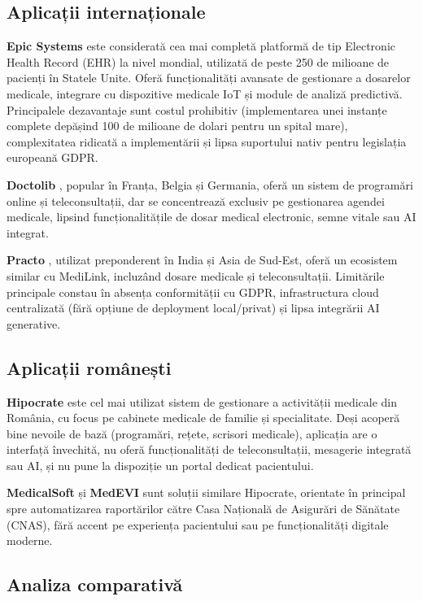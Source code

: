 \subsection{Aplicații internaționale}

\textbf{Epic Systems} \cite{epic2024} este considerată cea mai completă platformă de tip Electronic Health Record (EHR) la nivel mondial, utilizată de peste 250 de milioane de pacienți în Statele Unite. Oferă funcționalități avansate de gestionare a dosarelor medicale, integrare cu dispozitive medicale IoT și module de analiză predictivă. Principalele dezavantaje sunt costul prohibitiv (implementarea unei instanțe complete depășind 100 de milioane de dolari pentru un spital mare), complexitatea ridicată a implementării și lipsa suportului nativ pentru legislația europeană GDPR.

\textbf{Doctolib} \cite{doctolib2024}, popular în Franța, Belgia și Germania, oferă un sistem de programări online și teleconsultații, dar se concentrează exclusiv pe gestionarea agendei medicale, lipsind funcționalitățile de dosar medical electronic, semne vitale sau AI integrat.

\textbf{Practo} \cite{practo2024}, utilizat preponderent în India și Asia de Sud-Est, oferă un ecosistem similar cu MediLink, incluzând dosare medicale și teleconsultații. Limitările principale constau în absența conformității cu GDPR, infrastructura cloud centralizată (fără opțiune de deployment local/privat) și lipsa integrării AI generative.

\subsection{Aplicații românești}

\textbf{Hipocrate} \cite{hipocrate2024} este cel mai utilizat sistem de gestionare a activității medicale din România, cu focus pe cabinete medicale de familie și specialitate. Deși acoperă bine nevoile de bază (programări, rețete, scrisori medicale), aplicația are o interfață învechită, nu oferă funcționalități de teleconsultații, mesagerie integrată sau AI, și nu pune la dispoziție un portal dedicat pacientului.

\textbf{MedicalSoft} \cite{medicalsoft2024} și \textbf{MedEVI} sunt soluții similare Hipocrate, orientate în principal spre automatizarea raportărilor către Casa Națională de Asigurări de Sănătate (CNAS), fără accent pe experiența pacientului sau pe funcționalități digitale moderne.

\subsection{Analiza comparativă}

